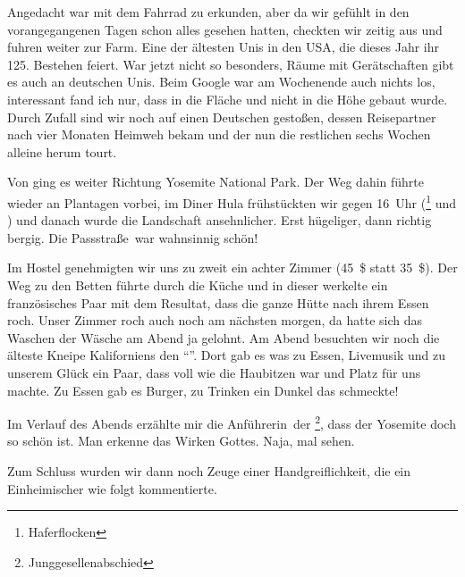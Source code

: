 Angedacht war  mit dem Fahrrad zu erkunden, aber da wir gefühlt in den vorangegangenen Tagen schon alles gesehen hatten, checkten wir zeitig aus und fuhren weiter zur \glqq Farm\grqq.
Eine der ältesten Unis in den USA, die dieses Jahr ihr 125. Bestehen feiert.
War jetzt nicht so besonders, Räume mit Gerätschaften gibt es auch an deutschen Unis.
Beim Google war am Wochenende auch nichts los, interessant fand ich nur, dass in die Fläche und nicht in die Höhe gebaut wurde.
Durch Zufall sind wir noch auf einen Deutschen gestoßen, dessen Reisepartner nach vier Monaten Heimweh bekam und der nun die restlichen sechs Wochen alleine herum tourt.

Von  ging es weiter Richtung Yosemite National Park.
Der Weg dahin führte wieder an Plantagen vorbei, im Diner Hula frühstückten wir gegen 16~Uhr (\footnote{Haferflocken} und ) und danach wurde die Landschaft ansehnlicher.
Erst hügeliger, dann richtig bergig.
Die \glqq Passstraße\grqq \, war wahnsinnig schön!

Im Hostel  genehmigten wir uns zu zweit ein achter Zimmer (45~\$ statt 35~\$).
Der Weg zu den Betten führte durch die Küche und in dieser werkelte ein französisches Paar mit dem Resultat, dass die ganze Hütte nach ihrem Essen roch.
Unser Zimmer roch auch noch am nächsten morgen, da hatte sich das Waschen der Wäsche am Abend ja gelohnt.
Am Abend besuchten wir noch die älteste Kneipe Kaliforniens den ``''.
Dort gab es was zu Essen, Livemusik und zu unserem Glück ein Paar, dass voll wie die Haubitzen war und Platz für uns machte.
Zu Essen gab es Burger, zu Trinken ein Dunkel das schmeckte!

Im Verlauf des Abends erzählte mir die \glqq Anführerin\grqq \, der \footnote{Junggesellenabschied}, dass der Yosemite doch so schön ist.
Man erkenne das Wirken Gottes.
Naja, mal sehen.

Zum Schluss wurden wir dann noch Zeuge einer Handgreiflichkeit, die ein Einheimischer wie folgt kommentierte.

\begin{quote}
\end{quote}
